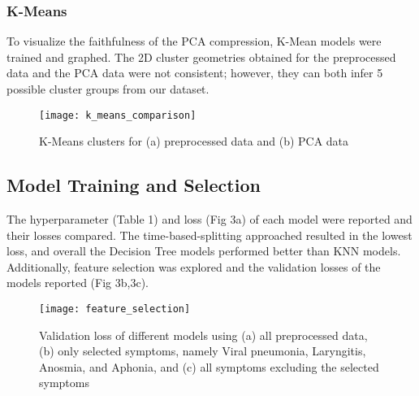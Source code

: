 \documentclass[12pt]{article}
\begin{document}
\subsubsection{K-Means}
To visualize the faithfulness of the PCA compression, K-Mean models were trained and graphed. The 2D cluster geometries obtained for the preprocessed data and the PCA data were not consistent; however, they can both infer 5 possible cluster groups from our dataset.

\begin{figure}[!htb]
    \centering
    \texttt{[image: k\_means\_comparison]}
    \caption{K-Means clusters for (a) preprocessed data and (b) PCA data}
\end{figure}

\subsection{Model Training and Selection}
The hyperparameter (Table 1) and loss (Fig 3a) of each model were reported and their losses compared. The time-based-splitting approached resulted in the lowest loss, and overall the Decision Tree models performed better than KNN models. 
Additionally, feature selection was explored and the validation losses of the models reported (Fig 3b,3c).
\begin{table}[!htb]
\centering
{}
\caption{\label{tab:table-name} Selected hyperparameters and validation losses for all models.}
\end{table}

\begin{figure}[!htb]
    \centering
    \texttt{[image: feature\_selection]}
    \caption{Validation loss of different models using (a) all preprocessed data, (b) only selected symptoms, namely Viral pneumonia, Laryngitis, Anosmia, and Aphonia, and (c) all symptoms excluding the selected symptoms}
\end{figure}
\end{document}
